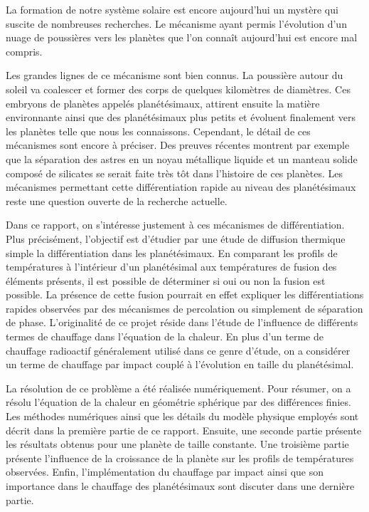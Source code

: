 \documentclass[10pt,a4paper]{article}
\numberwithin{equation}{section}
\begin{document}
La formation de notre système solaire est encore aujourd'hui un mystère qui suscite de nombreuses recherches. Le mécanisme ayant permis l'évolution d'un nuage de poussières vers les planètes que l'on connaît aujourd'hui est encore mal compris. 
\medskip

Les grandes lignes de ce mécanisme sont bien connus. La poussière autour du soleil va coalescer et former des corps de quelques kilomètres de diamètres. Ces embryons de planètes appelés planétésimaux, attirent ensuite la matière environnante ainsi que des planétésimaux plus petits et évoluent finalement vers les planètes telle que nous les connaissons.
Cependant, le détail de ces mécanismes sont encore à préciser. Des preuves récentes montrent par exemple que la séparation des astres en un noyau métallique liquide et un manteau solide composé de silicates se serait faite très tôt dans l'histoire de ces planètes. Les mécanismes permettant cette différentiation rapide au niveau des planétésimaux reste une question ouverte de la recherche actuelle. 
\medskip

Dans ce rapport, on s'intéresse justement à ces mécanismes de différentiation. Plus précisément, l'objectif est d'étudier par une étude de diffusion thermique simple la différentiation dans les planétésimaux. En comparant les profils de températures à l'intérieur d'un planétésimal aux températures de fusion des éléments présents, il est possible de déterminer si oui ou non la fusion est possible. La présence de cette fusion pourrait en effet expliquer les différentiations rapides observées par des mécanismes de percolation ou simplement de séparation de phase. 
L'originalité de ce projet réside dans l'étude de l'influence de différents termes de chauffage dans l'équation de la chaleur. En plus d'un terme de chauffage radioactif généralement utilisé dans ce genre d'étude, on a considérer un terme de chauffage par impact couplé à l'évolution en taille du planétésimal.
\medskip

La résolution de ce problème a été réalisée numériquement. Pour résumer, on a résolu l'équation de la chaleur en géométrie sphérique par des différences finies. Les méthodes numériques ainsi que les détails du modèle physique employés sont décrit dans la première partie de ce rapport. Ensuite, une seconde partie présente les résultats obtenus pour une planète de taille constante. Une troisième partie présente l'influence de la croissance de la planète sur les profils de températures observées. Enfin, l'implémentation du chauffage par impact ainsi que son importance dans le chauffage des planétésimaux sont discuter dans une dernière partie.
\end{document}
